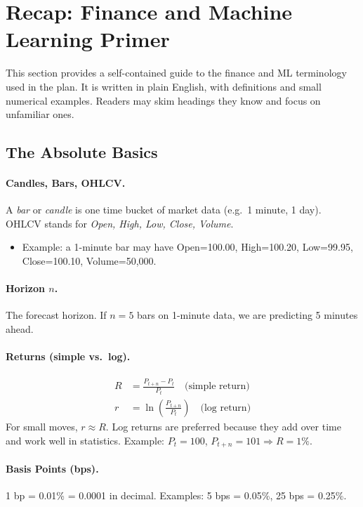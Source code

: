 \documentclass[11pt]{article}
\begin{document}
    \section{Recap: Finance and Machine Learning Primer}

    This section provides a self-contained guide to the finance and ML terminology used in the plan.
    It is written in plain English, with definitions and small numerical examples.
    Readers may skim headings they know and focus on unfamiliar ones.

    \subsection{The Absolute Basics}

    \paragraph{Candles, Bars, OHLCV.}
    A \emph{bar} or \emph{candle} is one time bucket of market data (e.g.\ 1 minute, 1 day).
    OHLCV stands for \emph{Open, High, Low, Close, Volume}.
    \begin{itemize}
        \item Example: a 1-minute bar may have Open=100.00, High=100.20, Low=99.95, Close=100.10, Volume=50{,}000.
    \end{itemize}

    \paragraph{Horizon $n$.}
    The forecast horizon. If $n=5$ bars on 1-minute data, we are predicting 5 minutes ahead.

    \paragraph{Returns (simple vs.\ log).}
    \begin{align*}
        R &= \frac{P_{t+n} - P_t}{P_t} \quad \text{(simple return)} \\
        r &= \ln\!\left(\frac{P_{t+n}}{P_t}\right) \quad \text{(log return)}
    \end{align*}
    For small moves, $r \approx R$. Log returns are preferred because they add over time and work well in statistics.
    Example: $P_t=100$, $P_{t+n}=101 \Rightarrow R=1\%$.

    \paragraph{Basis Points (bps).}
    1 bp = 0.01\% = 0.0001 in decimal.
    Examples: 5 bps = 0.05\%, 25 bps = 0.25\%.
\end{document}
